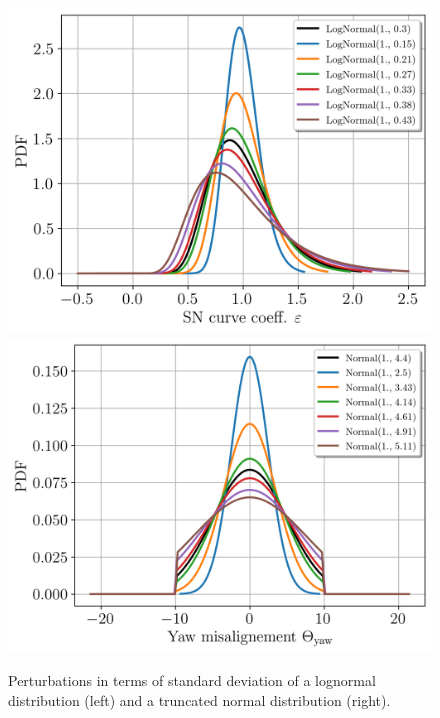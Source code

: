 \begin{figure}
    \centering
        \includegraphics[width=0.43\linewidth]{./part3/figures/OWT/lognormal_pert.png}
        \includegraphics[width=0.44\linewidth]{./part3/figures/OWT/normal_pert.png}
    \caption{Perturbations in terms of standard deviation of a lognormal distribution (left) and a truncated normal distribution (right).}
    \label{fig:perturbations}
\end{figure}


